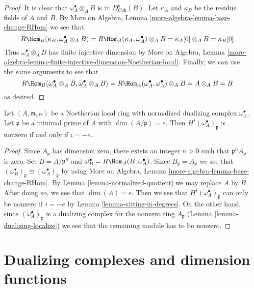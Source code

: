 \begin{proof}
It is clear that $\omega_A^\bullet \otimes_A B$ is in $D^b_{\textit{Coh}}(B)$.
Let $\kappa_A$ and $\kappa_B$ be the residue fields of $A$ and $B$.
By More on Algebra, Lemma \ref{more-algebra-lemma-base-change-RHom}
we see that
$$
R\Hom_B(\kappa_B, \omega_A^\bullet \otimes_A B) =
R\Hom_A(\kappa_A, \omega_A^\bullet) \otimes_A B =
\kappa_A[0] \otimes_A B = \kappa_B[0]
$$
Thus $\omega_A^\bullet \otimes_A B$ has finite injective dimension by
More on Algebra, Lemma
\ref{more-algebra-lemma-finite-injective-dimension-Noetherian-local}.
Finally, we can use the same arguments to see that
$$
R\Hom_B(\omega_A^\bullet \otimes_A B, \omega_A^\bullet \otimes_A B) =
R\Hom_A(\omega_A^\bullet, \omega_A^\bullet) \otimes_A B = A \otimes_A B = B
$$
as desired.
\end{proof}

\begin{lemma}
\label{lemma-nonvanishing-generically-local}
Let $(A, \mathfrak m, \kappa)$ be a Noetherian local ring with
normalized dualizing complex $\omega_A^\bullet$.
Let $\mathfrak p$ be a minimal prime of $A$ with
$\dim(A/\mathfrak p) = e$. Then
$H^i(\omega_A^\bullet)_\mathfrak p$ is nonzero
if and only if $i = -e$.
\end{lemma}

\begin{proof}
Since $A_\mathfrak p$ has dimension zero, there exists an integer
$n > 0$ such that $\mathfrak p^nA_\mathfrak p$ is zero.
Set $B = A/\mathfrak p^n$ and
$\omega_B^\bullet = R\Hom_A(B, \omega_A^\bullet)$.
Since $B_\mathfrak p = A_\mathfrak p$ we see that
$(\omega_B^\bullet)_\mathfrak p \cong (\omega_A^\bullet)_\mathfrak p$
by using More on Algebra, Lemma \ref{more-algebra-lemma-base-change-RHom}.
By Lemma \ref{lemma-normalized-quotient} we may replace $A$ by $B$.
After doing so, we see that $\dim(A) = e$. Then we see that
$H^i(\omega_A^\bullet)_\mathfrak p$ can only be nonzero if $i = -e$
by Lemma \ref{lemma-sitting-in-degrees}.
On the other hand, since $(\omega_A^\bullet)_\mathfrak p$
is a dualizing complex for the nonzero ring $A_\mathfrak p$
(Lemma \ref{lemma-dualizing-localize})
we see that the remaining module has to be nonzero.
\end{proof}





\section{Dualizing complexes and dimension functions}
\label{section-dimension-function}

